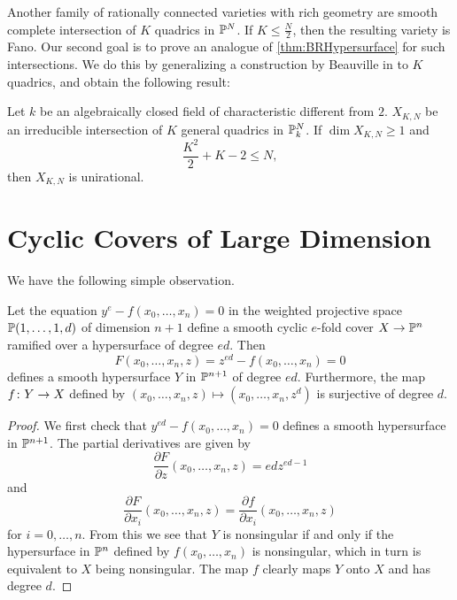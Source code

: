 Another family of rationally connected varieties with rich geometry are smooth complete intersection of $K$ quadrics in $\P^N$. If $K \leq \frac{N}{2}$, then the resulting variety is Fano. Our second goal is to prove an analogue of \cref{thm:BRHypersurface} for such intersections. We do this by generalizing a construction by Beauville in \cite[1.4.4]{Beauville} to $K$ quadrics, and obtain the following result:
\begin{theorem}
  \label{thm:QuadricsUnirationalIntroduction}
	Let $k$ be an algebraically closed field of characteristic different from $2$. $X_{K,N}$ be an irreducible intersection of $K$ general quadrics in $\P_k^N$. If $\dim X_{K,N} \geq 1$ and
	\[\frac{K^2}{2} + K - 2 \leq N,\]
	then $X_{K,N}$ is unirational.
\end{theorem}

	\section{Cyclic Covers of Large Dimension}
	We have the following simple observation.
	\begin{lemma}
		\label{lem:DominatingHypersurface}
		Let the equation $y^e-f(x_0,\dots,x_n) = 0$ in the weighted projective space $\P(1,\dots,1,d)$ of dimension $n+1$ define a smooth cyclic $e$-fold cover $X \to \P^n$ ramified over a hypersurface of degree $ed$. Then 
\[F(x_0,\dots,x_n,z) = z^{ed}-f(x_0,\dots,x_n) = 0\]
 defines a smooth hypersurface $Y$ in $\P^{n+1}$ of degree $ed$. Furthermore, the map $f \from Y \to X$ defined by $(x_0,\dots,x_n,z) \mapsto (x_0,\dots,x_n,z^d)$ is surjective of degree $d$.
	\end{lemma}
	\begin{proof}
		We first check that $y^{ed}-f(x_0,\dots,x_n) = 0$ defines a smooth hypersurface in $\P^{n+1}$. The partial derivatives are given by
		\[\frac{\partial F}{\partial z}(x_0,\dots,x_n,z) = edz^{ed-1}\]
		and
		\[\frac{\partial F}{\partial x_i}(x_0,\dots,x_n,z) = \frac{\partial f}{\partial x_i}(x_0,\dots,x_n,z)\]
		for $i=0,\dots,n$.
		From this we see that $Y$ is nonsingular if and only if the hypersurface in $\P^n$ defined by $f(x_0,\dots,x_n)$ is nonsingular, which in turn is equivalent to $X$ being nonsingular. The map $f$ clearly maps $Y$ onto $X$ and has degree $d$.
	\end{proof}

